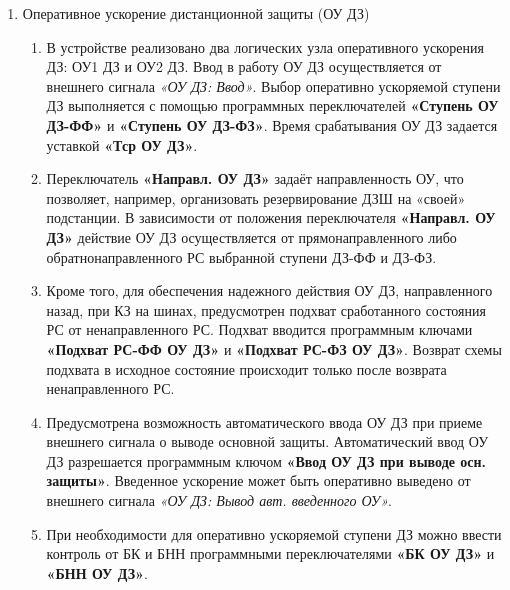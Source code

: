 \begin{enumerate}
\begin{enumerate}
\item
Уставки автоматического ускорения ДЗ (АУ ДЗ) представлены в таблице \ref{app_set:dz}.


\end{enumerate}


\item\label{sec:secou} Оперативное ускорение дистанционной защиты (ОУ ДЗ)
\begin{enumerate}

\item
В устройстве реализовано два логических узла оперативного ускорения ДЗ: ОУ1 ДЗ и ОУ2 ДЗ. Ввод в работу ОУ ДЗ осуществляется от внешнего сигнала \textit{«ОУ ДЗ: Ввод»}. Выбор оперативно ускоряемой ступени ДЗ выполняется с помощью программных переключателей \textbf{«Ступень ОУ ДЗ-ФФ»} и \textbf{«Ступень ОУ ДЗ-ФЗ»}. Время срабатывания ОУ ДЗ задается уставкой \textbf{«Тср ОУ ДЗ»}.

\item
Переключатель \textbf{«Направл. ОУ ДЗ»} задаёт направленность ОУ, что позволяет, например, организовать резервирование ДЗШ на «своей» подстанции. В зависимости от положения переключателя \textbf{«Направл. ОУ ДЗ»} действие ОУ ДЗ осуществляется от прямонаправленного либо обратнонаправленного РС выбранной ступени ДЗ-ФФ и ДЗ-ФЗ.

\item
Кроме того, для обеспечения надежного действия ОУ ДЗ, направленного назад, при КЗ на шинах, предусмотрен подхват сработанного состояния РС от ненаправленного РС. Подхват вводится программным ключами \textbf{«Подхват РС-ФФ ОУ ДЗ»} и \textbf{«Подхват РС-ФЗ ОУ ДЗ»}. Возврат схемы подхвата в исходное состояние происходит только после возврата ненаправленного РС.

\item
Предусмотрена возможность автоматического ввода ОУ ДЗ при приеме внешнего сигнала о выводе основной защиты. Автоматический ввод ОУ ДЗ разрешается программным ключом \textbf{«Ввод ОУ ДЗ при выводе осн. защиты»}. Введенное ускорение может быть оперативно выведено от внешнего сигнала \textit{«ОУ ДЗ: Вывод авт. введенного ОУ»}.

\item
При необходимости для оперативно ускоряемой ступени ДЗ можно ввести контроль от БК и БНН программными переключателями \textbf{«БК ОУ ДЗ»} и \textbf{«БНН ОУ ДЗ»}.


\end{enumerate}
\end{enumerate}
